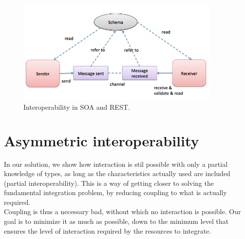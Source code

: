  \begin{figure}[!htb]
   \centering
   \includegraphics[width=0.9\textwidth]{Figures/schema.png}
   \caption[Interoperability in SOA and REST.]{Interoperability in SOA and REST.}
   \label{fig:interoperability}
 \end{figure}

 \section{Asymmetric interoperability}
 \label{section:AsymmetricInteroperability}

In our solution, we show how interaction is stil possible with only a partial knowledge of types, as long as the
characteristics actually used are included (partial interoperability). This is a way of getting closer to solving the
fundamental integration problem, by reducing coupling to what is actually required.\\

Coupling is thus a necessary bad, without which no interaction is possible. Our goal is to minimize it as much as
possible, down to the minimum level that ensures the level of interaction required by the resources to integrate.\\

